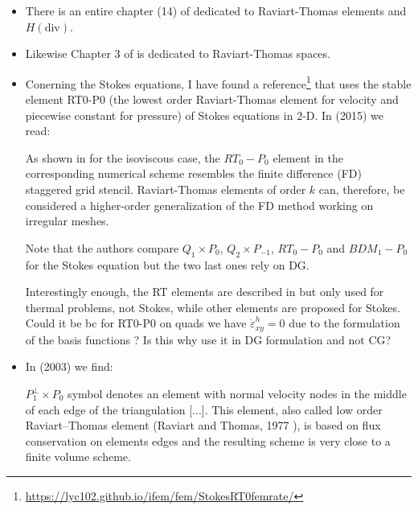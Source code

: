\begin{itemize}

\item 
There is an entire chapter (14) of \textcite{ergu21_72} dedicated to 
Raviart-Thomas elements and $H(\text{div})$.
\item 
Likewise Chapter 3 of \textcite{gatica} is dedicated to Raviart-Thomas spaces.

\item 
Conerning the Stokes equations, 
I have found a reference\footnote{\url{https://lyc102.github.io/ifem/fem/StokesRT0femrate/}}
that uses the stable element RT0-P0 (the lowest order Raviart-Thomas element for velocity 
and piecewise constant for pressure) of Stokes equations in 2-D.
In \textcite{lelk15} (2015) we read:
\begin{displayquote}
{\color{darkgray}
As shown in \cite{kans08} for the isoviscous case, the $RT_0-P_0$ element in the 
corresponding numerical scheme resembles the finite difference (FD) staggered grid 
stencil. Raviart-Thomas elements of order $k$ can, therefore, be considered a higher-order
generalization of the FD method working on irregular meshes.
}
\end{displayquote}
Note that the authors compare $Q_1\times P_0$, $Q_2 \times P_{-1}$, $RT_0-P_0$ and 
$BDM_1-P_0$ for the Stokes equation but the two last ones rely on DG. 

Interestingly enough, the RT elements are described in \cite{aubb17} but 
only used for thermal problems, not Stokes, while other elements are proposed 
for Stokes. Could it be bc for RT0-P0 on quads we have $\dot{\varepsilon}^h_{xy}=0$
due to the formulation of the basis functions ? Is this why \cite{lelk15}
use it in DG formulation and not CG?

 
\item 
In \textcite{hald03} (2003) we find: 
\begin{displayquote}
{\color{darkgray}
$P_1^\perp \times P_0$ symbol denotes an element with 
normal velocity nodes in the middle of each edge of the
triangulation [...]. This element, also called low order Raviart–Thomas element 
(Raviart and Thomas, 1977 \cite{rath77}), is based on flux conservation on elements edges and 
the resulting scheme is very close to a finite volume scheme.
}
\end{displayquote}


\end{itemize}
